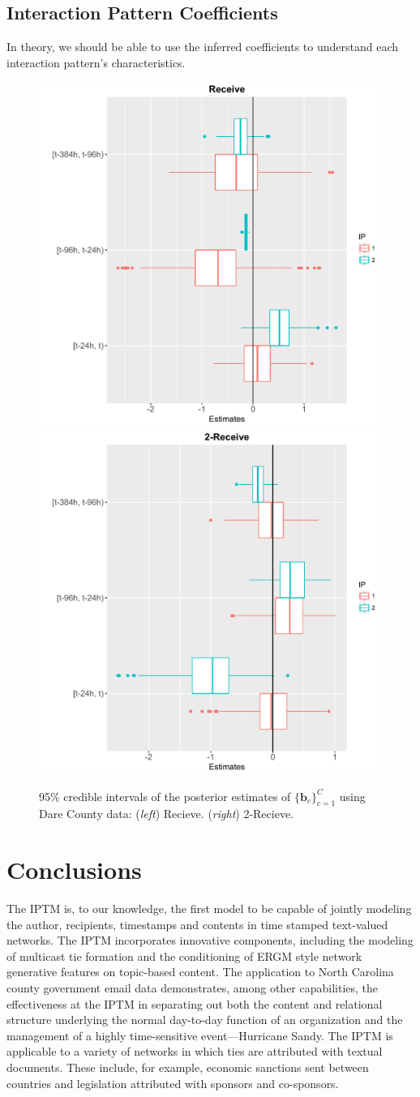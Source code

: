 \documentclass[twoside]{article}
\begin{document}
\subsection{Interaction Pattern Coefficients}\label{subsec:Interaction Pattern Coefficients}
In theory, we should be able to use the inferred coefficients to
understand each interaction pattern's characteristics.
\begin{figure}[h]
	\centering
\includegraphics[width=.235\textwidth]{plots/receive.pdf} \includegraphics[width=.235\textwidth]{plots/2receive.pdf}
	\caption{95\% credible intervals of the posterior estimates of $\{\boldsymbol{b}_c\}_{c=1}^C$ using Dare County data: (\textit{left}) Recieve. (\textit{right}) 2-Recieve. }
	\label{fig:b}
\end{figure}
\section{Conclusions}\label{sec:Conclusions}
The IPTM is, to our knowledge, the first model to be capable of jointly modeling the author, recipients, timestamps and contents in time stamped text-valued networks. The IPTM incorporates innovative components, including the modeling of multicast tie formation and the conditioning of ERGM style network generative features on topic-based content. The application to North Carolina county government email data demonstrates, among other capabilities, the effectiveness at the IPTM in separating out both the content and relational structure underlying the normal day-to-day function of an organization and the management of a highly time-sensitive event---Hurricane Sandy. The IPTM is applicable to a variety of networks in which ties are attributed with textual documents. These include, for example, economic sanctions sent between countries and legislation attributed with sponsors and co-sponsors. 
\end{document}
